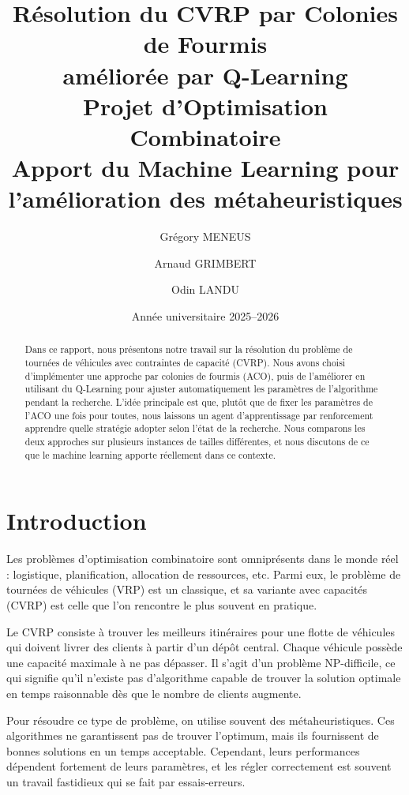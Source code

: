 \documentclass[12pt, a4paper]{article}
\title{
    \vspace{-1cm}
    \textbf{Résolution du CVRP par Colonies de Fourmis\\améliorée par Q-Learning}\\[0.5cm]
    \large Projet d'Optimisation Combinatoire\\
    Apport du Machine Learning pour l'amélioration des métaheuristiques
}
\author{
    Grégory MENEUS \and Arnaud GRIMBERT \and Odin LANDU
}
\date{Année universitaire 2025--2026}
\begin{document}
\maketitle

\begin{abstract}
Dans ce rapport, nous présentons notre travail sur la résolution du problème de tournées de véhicules avec contraintes de capacité (CVRP). Nous avons choisi d'implémenter une approche par colonies de fourmis (ACO), puis de l'améliorer en utilisant du Q-Learning pour ajuster automatiquement les paramètres de l'algorithme pendant la recherche. L'idée principale est que, plutôt que de fixer les paramètres de l'ACO une fois pour toutes, nous laissons un agent d'apprentissage par renforcement apprendre quelle stratégie adopter selon l'état de la recherche. Nous comparons les deux approches sur plusieurs instances de tailles différentes, et nous discutons de ce que le machine learning apporte réellement dans ce contexte.
\end{abstract}

\tableofcontents
\newpage

\section{Introduction}

Les problèmes d'optimisation combinatoire sont omniprésents dans le monde réel : logistique, planification, allocation de ressources, etc. Parmi eux, le problème de tournées de véhicules (VRP) est un classique, et sa variante avec capacités (CVRP) est celle que l'on rencontre le plus souvent en pratique.

Le CVRP consiste à trouver les meilleurs itinéraires pour une flotte de véhicules qui doivent livrer des clients à partir d'un dépôt central. Chaque véhicule possède une capacité maximale à ne pas dépasser. Il s'agit d'un problème NP-difficile, ce qui signifie qu'il n'existe pas d'algorithme capable de trouver la solution optimale en temps raisonnable dès que le nombre de clients augmente.

Pour résoudre ce type de problème, on utilise souvent des métaheuristiques. Ces algorithmes ne garantissent pas de trouver l'optimum, mais ils fournissent de bonnes solutions en un temps acceptable. Cependant, leurs performances dépendent fortement de leurs paramètres, et les régler correctement est souvent un travail fastidieux qui se fait par essais-erreurs.
\end{document}

